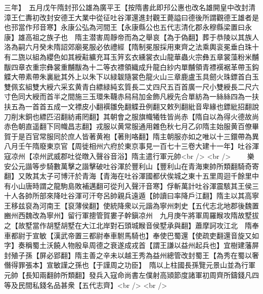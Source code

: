 三年】　五月戊午隋封邘公雄為廣平王【按隋書此即䢴公惠也改名雄開皇中改封清漳王仁夀初改封安德王大業中從征吐谷渾還進封觀王薨謚曰德後所謂觀德王雄者是也邘當作䢴音寒】永康公弘為河間王【永康縣公也五代志清化郡永穆縣梁置曰永康】雄高祖之族子也　隋主潜害周靜帝而為之舉哀【為于偽翻】葬于恭陵以其族人洛為嗣六月癸未隋詔郊廟冕服必依禮經【隋制冕服採用東齊之法乘輿衮冕垂白珠十有二旒以組為纓色如其綬黈纊充耳玉笄玄衣纁裳衣山龍華蟲火宗彝五章裳藻粉米黼黻四章衣重宗彝裳重黼黻為十二等衣褾領織成升龍白紗内單黼領青褾襈裾革帶玉鈎䚢大帶素帶朱裏紕其外上以朱下以緑韍隨裳色龍火山三章鹿盧玉具劒火珠鏢首白玉雙佩玄組雙大綬六采玄黄青白縹緑純玄質長二丈四尺五百首廣一尺小雙綬長二尺六寸色同大綬而首半之間施三玉環朱韈赤舄舄加金飾凡綬先合單紡為一絲絲四為一扶扶五為一首首五成一文褾皮小翻襈雛免翻䚢丑例翻又敕列翻紕音卑緣也鏢紕招翻說刀削末銅也縹匹沼翻紡甫罔翻】其朝會之服旗幟犧牲皆尚赤【隋自以為得火德故尚赤色朝直遥翻下同幟昌志翻】戎服以黄常服通用雜色秋七月乙卯隋主始服黄百僚畢賀于是百官常服同於庶人皆著黄袍【著則咯翻】隋主朝服亦如之唯以十三鐶帶為異八月壬午隋廢東京官【周徙相州六府於東京事見一百七十三卷大建十一年】吐谷渾寇凉州【凉州武威郡吐從暾入聲谷音浴】隋主遣行軍元帥<br />
<br />
　　樂安公元諧等步騎數萬擊之諧擊破吐谷渾於豐利山【豐利山在青海東帥所類翻騎奇寄翻】又敗其太子可博汗於青海【青海在吐谷渾國都伏俟城之東十五里周迴千餘里中有小山唐時謂之龍駒島敗補邁翻可從刋入聲汗音寒】俘斬萬計吐谷渾震駭其王侯三十人各帥所部來降吐谷渾可汗夸呂帥親兵遠遁【帥讀曰率降戶江翻】隋主以其高寧王移兹裒為河南王【裒薄侯翻】使統降衆以元諧為寧州刺史【五代志北地郡後魏置豳州西魏改為寧州】留行軍摠管賀婁子幹鎭凉州　九月庚午將軍周羅睺攻隋故墅拔之【故墅當作胡墅胡墅在大江北岸對石頭城睺音侯墅承與翻】蕭摩訶攻江北　隋奉車都尉于宣敏【漢武帝置三都尉奉車駙馬騎也】奉使巴蜀還【使疏吏翻還音旋又如字】奏稱蜀土沃饒人物殷阜周德之衰遂成戎首【謂王謙以益州起兵也】宜樹建藩屏封殖子孫【屏必郢翻】隋主善之辛未以越王秀為益州總管改封蜀王【為秀在蜀以奢僭得罪張本】宣敏謹之孫也【于謹周之功臣】　隋以上柱國長孫覽元景山並為行軍元帥【長知兩翻帥所類翻】發兵入寇命尚書左僕射高熲節度諸軍初周齊所鑄錢凡四等及民間私錢名品甚衆【五代志齊】<br />
<br />
